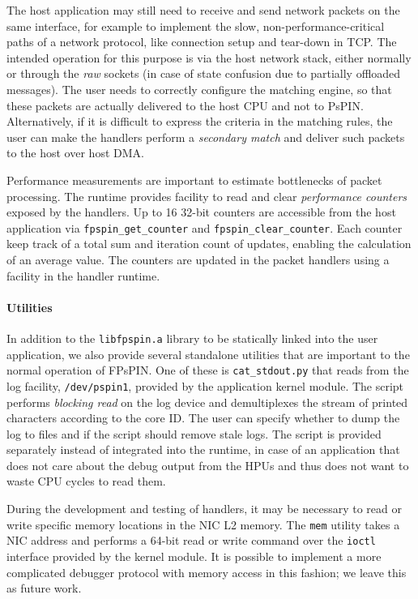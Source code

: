 The host application may still need to receive and send network packets on the same interface, for example to implement the slow, non-performance-critical paths of a network protocol, like connection setup and tear-down in TCP.  The intended operation for this purpose is via the host network stack, either normally or through the \emph{raw} sockets (in case of state confusion due to partially offloaded messages).  The user needs to correctly configure the matching engine, so that these packets are actually delivered to the host CPU and not to PsPIN.  Alternatively, if it is difficult to express the criteria in the matching rules, the user can make the handlers perform a \emph{secondary match} and deliver such packets to the host over host DMA.

Performance measurements are important to estimate bottlenecks of packet processing.  The runtime provides facility to read and clear \emph{performance counters} exposed by the handlers.  Up to 16 32-bit counters are accessible from the host application via \texttt{fpspin\_\-get\_\-counter} and \texttt{fpspin\_\-clear\_\-counter}.  Each counter keep track of a total sum and iteration count of updates, enabling the calculation of an average value.  The counters are updated in the packet handlers using a facility in the handler runtime.

\paragraph{Utilities} In addition to the \texttt{libfpspin.a} library to be statically linked into the user application, we also provide several standalone utilities that are important to the normal operation of FPsPIN.  One of these is \texttt{cat\_stdout.py} that reads from the log facility, \texttt{/dev/pspin1}, provided by the application kernel module.  The script performs \emph{blocking read} on the log device and demultiplexes the stream of printed characters according to the core ID.  The user can specify whether to dump the log to files and if the script should remove stale logs.  The script is provided separately instead of integrated into the runtime, in case of an application that does not care about the debug output from the HPUs and thus does not want to waste CPU cycles to read them.

During the development and testing of handlers, it may be necessary to read or write specific memory locations in the NIC L2 memory.  The \texttt{mem} utility takes a NIC address and performs a 64-bit read or write command over the \texttt{ioctl} interface provided by the kernel module.  It is possible to implement a more complicated debugger protocol with memory access in this fashion; we leave this as future work.


